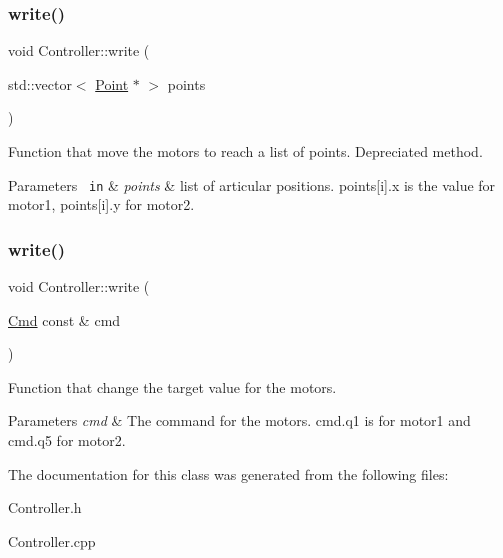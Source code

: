 \subsubsection{\texorpdfstring{write()}{write()}\hspace{0.1cm}{\footnotesize\ttfamily [2/3]}}
{\footnotesize\ttfamily void Controller\+::write (\begin{DoxyParamCaption}\item[{std\+::vector$<$ \mbox{\hyperlink{struct_point}{Point}} $\ast$ $>$}]{points }\end{DoxyParamCaption})}



Function that move the motors to reach a list of points. Depreciated method. 


\begin{DoxyParams}[1]{Parameters}
\mbox{\texttt{ in}}  & {\em points} & list of articular positions. points\mbox{[}i\mbox{]}.x is the value for motor1, points\mbox{[}i\mbox{]}.y for motor2. \\
\hline
\end{DoxyParams}
\mbox{\label{class_controller_a68ebf75325d5f6731279f52bef348757}} 
\subsubsection{\texorpdfstring{write()}{write()}\hspace{0.1cm}{\footnotesize\ttfamily [3/3]}}
{\footnotesize\ttfamily void Controller\+::write (\begin{DoxyParamCaption}\item[{\mbox{\hyperlink{struct_cmd}{Cmd}} const \&}]{cmd }\end{DoxyParamCaption})}



Function that change the target value for the motors. 


\begin{DoxyParams}{Parameters}
{\em cmd} & The command for the motors. cmd.\+q1 is for motor1 and cmd.\+q5 for motor2. \\
\hline
\end{DoxyParams}


The documentation for this class was generated from the following files\+:\begin{DoxyCompactItemize}
\item 
Controller.\+h\item 
Controller.\+cpp\end{DoxyCompactItemize}
